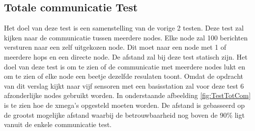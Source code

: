\subsection{Totale communicatie Test}
Het doel van deze test is een samenstelling van de vorige 2 testen. Deze test zal kijken naar de communicatie tussen meerdere nodes.
Elke node zal 100 berichten versturen naar een zelf uitgekozen node. Dit moet naar een node met 1 of meerdere hops en een directe node.
De afstand zal bij deze test statisch zijn. Het doel van deze test is om te zien of de communicatie met meerdere nodes lukt en om te zien 
of elke node een beetje dezelfde resulaten toont. 
Omdat de opdracht van dit verslag kijkt naar vijf sensoren met een basisstation zal voor deze test 6 afzonderlijke nodes gebruikt worden.
In onderstaande afbeelding \ref{fig:TestTotCom} is te zien hoe de xmega's opgesteld moeten worden. De afstand is gebasseerd op de grootst 
mogelijke afstand waarbij de betrouwbaarheid nog boven de 90\% ligt vanuit de enkele communicatie test.

